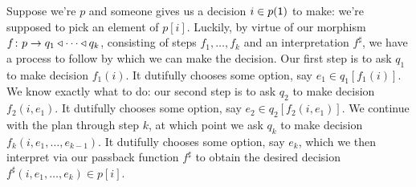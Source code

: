 \documentclass[DynamicalBook]{subfiles}
\begin{document}
Suppose we're $p$ and someone gives us a decision $i\in p(\textsf{1})$ to make: we're supposed to pick an element of $p[i]$. Luckily, by virtue of our morphism $f\colon p\to q_1\mathbin{\triangleleft}\cdots\mathbin{\triangleleft} q_k$, consisting of steps $f_1,\ldots,f_k$ and an interpretation $f^\sharp$, we have a process to follow by which we can make the decision. Our first step is to ask $q_1$ to make decision $f_1(i)$. It dutifully chooses some option, say $e_1\in q_1[f_1(i)]$. We know exactly what to do: our second step is to ask $q_2$ to make decision $f_2(i,e_1)$. It dutifully chooses some option, say $e_2\in q_2[f_2(i,e_1)]$. We continue with the plan through step $k$, at which point we ask $q_k$ to make decision $f_k(i,e_1,\ldots,e_{k-1})$. It dutifully chooses some option, say $e_k$, which we then interpret via our passback function $f^\sharp$ to obtain the desired decision $f^\sharp(i,e_1,\ldots,e_k)\in p[i]$.

\end{document}
